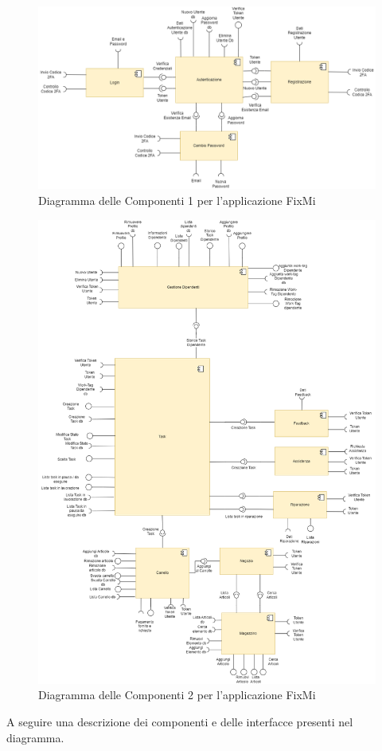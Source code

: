 \documentclass{report}
\begin{document}
\begin{figure}[H]
	\centering\includegraphics[width=1\textwidth]{images/autenticazione_diagramma_dei_componenti.png}
	Diagramma delle Componenti 1 per l'applicazione FixMi
\end{figure}

\begin{figure}[H]
	\centering\includegraphics[width=1\textwidth]{images/diagramma_dei_componenti.png}
	Diagramma delle Componenti 2 per l'applicazione FixMi
\end{figure}
A seguire una descrizione dei componenti e delle interfacce presenti nel diagramma.
\end{document}
